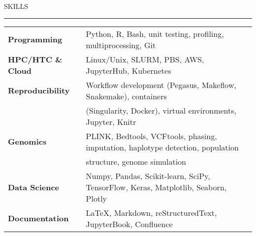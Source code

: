 \documentclass{resume} %
\renewenvironment{rSection}[1]{
\sectionskip
\textcolor{RoyalPurple}{\MakeUppercase{#1}}
\sectionlineskip
\hrule
\begin{list}{}{
\setlength{\leftmargin}{1.5em}
}
\item[]
}{
\end{list}
}
\begin{document}
\begin{rSection}{Skills}

\begin{tabular}{ @{} >{\bfseries}l @{\hspace{6ex}} l }
Programming & Python, R, Bash, unit testing, profiling, multiprocessing, Git\\
HPC/HTC \& Cloud & Linux/Unix, SLURM, PBS, AWS, JupyterHub, Kubernetes  \\
Reproducibility & Workflow development (Pegasus, Makeflow, Snakemake), containers \\ & (Singularity, Docker), virtual environments, Jupyter, Knitr \\
Genomics & PLINK, Bedtools, VCFtools, phasing, imputation, haplotype detection, population \\ & structure, genome simulation\\
Data Science & Numpy, Pandas, Scikit-learn, SciPy, TensorFlow, Keras, Matplotlib, Seaborn, Plotly \\
Documentation & \LaTeX, Markdown, reStructuredText, JupyterBook, Confluence \\
\end{tabular}

\end{rSection}

\end{document}
